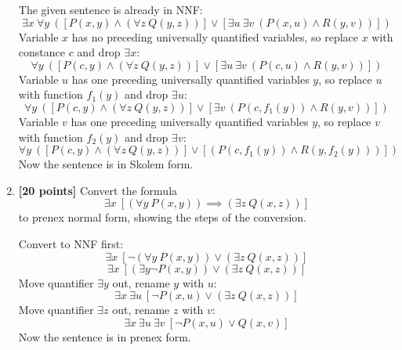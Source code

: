 \documentclass{article}
\begin{document}
\begin{enumerate}
  \begin{answer}
    The given sentence is already in NNF:
    \begin{displaymath}
      \exists x\ \forall y\ \left( [P(x,y) \land (\forall z\ Q(y,z))] \lor
        [\exists u\ \exists v\ (P(x,u) \land R(y,v))] \right)
    \end{displaymath}
    Variable $x$ has no preceding universally quantified variables, so replace
    $x$ with constance $c$ and drop $\exists x$:
    \begin{displaymath}
      \forall y\ \left( [P(c,y) \land (\forall z\ Q(y,z))] \lor
        [\exists u\ \exists v\ (P(c,u) \land R(y,v))] \right)
    \end{displaymath}
    Variable $u$ has one preceding universally quantified variables $y$, so replace
    $u$ with function $f_1(y)$ and drop $\exists u$:
    \begin{displaymath}
      \forall y\ \left( [P(c,y) \land (\forall z\ Q(y,z))] \lor
        [ \exists v\ (P(c,f_1(y)) \land R(y,v))] \right)
    \end{displaymath}
    Variable $v$ has one preceding universally quantified variables $y$, so replace
    $v$ with function $f_2(y)$ and drop $\exists v$:
    \begin{displaymath}
      \forall y\ \left( [P(c,y) \land (\forall z\ Q(y,z))] \lor
        [ (P(c,f_1(y)) \land R(y,f_2(y)))] \right)
    \end{displaymath}
    Now the sentence is in Skolem form.
  \end{answer}

\item \textbf{[20 points]} Convert the formula
  \begin{displaymath}
    \exists x\ [(\forall y\ P(x,y)) \implies (\exists z\ Q(x,z))]
  \end{displaymath}
  to prenex normal form, showing the steps of the conversion.
  
  \begin{answer}
    Convert to NNF first:
    \begin{displaymath}
      \exists x\ [\neg (\forall y\ P(x,y)) \lor (\exists z\ Q(x,z))]
    \end{displaymath}
    \begin{displaymath}
      \exists x\ [(\exists y \neg P(x,y)) \lor (\exists z\ Q(x,z))]
    \end{displaymath}
    Move quantifier $\exists y$ out, rename $y$ with $u$:
    \begin{displaymath}
      \exists x\ \exists u \ [\neg P(x,u) \lor (\exists z\ Q(x,z))]
    \end{displaymath}
    Move quantifier $\exists z$ out, rename $z$ with $v$:
    \begin{displaymath}
      \exists x\ \exists u\ \exists v\ [\neg P(x,u) \lor  Q(x,v)]
    \end{displaymath}
    Now the sentence is in prenex form.


\end{answer}
\end{enumerate}
\end{document}
